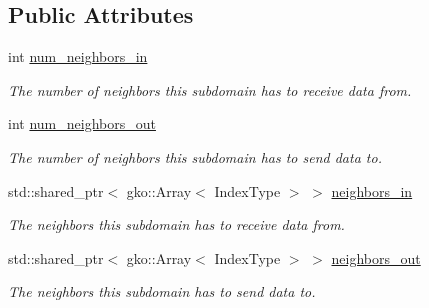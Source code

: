 \subsection*{Public Attributes}
\begin{DoxyCompactItemize}
\item 
\mbox{\label{structschwz_1_1Communicate_1_1comm__struct_aab657581d6c8ea5aba32f442edc4558f}} 
int \hyperlink{structschwz_1_1Communicate_1_1comm__struct_aab657581d6c8ea5aba32f442edc4558f}{num\+\_\+neighbors\+\_\+in}
\begin{DoxyCompactList}\small\item\em The number of neighbors this subdomain has to receive data from. \end{DoxyCompactList}\item 
\mbox{\label{structschwz_1_1Communicate_1_1comm__struct_a356e1582f7d5b0c4c8cba3eb11014b76}} 
int \hyperlink{structschwz_1_1Communicate_1_1comm__struct_a356e1582f7d5b0c4c8cba3eb11014b76}{num\+\_\+neighbors\+\_\+out}
\begin{DoxyCompactList}\small\item\em The number of neighbors this subdomain has to send data to. \end{DoxyCompactList}\item 
\mbox{\label{structschwz_1_1Communicate_1_1comm__struct_a0dcb204149fb4f730e62255a84bc156a}} 
std\+::shared\+\_\+ptr$<$ gko\+::\+Array$<$ Index\+Type $>$ $>$ \hyperlink{structschwz_1_1Communicate_1_1comm__struct_a0dcb204149fb4f730e62255a84bc156a}{neighbors\+\_\+in}
\begin{DoxyCompactList}\small\item\em The neighbors this subdomain has to receive data from. \end{DoxyCompactList}\item 
\mbox{\label{structschwz_1_1Communicate_1_1comm__struct_a6ae39215a67e0a19131d0249e9fd2083}} 
std\+::shared\+\_\+ptr$<$ gko\+::\+Array$<$ Index\+Type $>$ $>$ \hyperlink{structschwz_1_1Communicate_1_1comm__struct_a6ae39215a67e0a19131d0249e9fd2083}{neighbors\+\_\+out}
\begin{DoxyCompactList}\small\item\em The neighbors this subdomain has to send data to. \end{DoxyCompactList}\item 

\end{DoxyCompactItemize}
